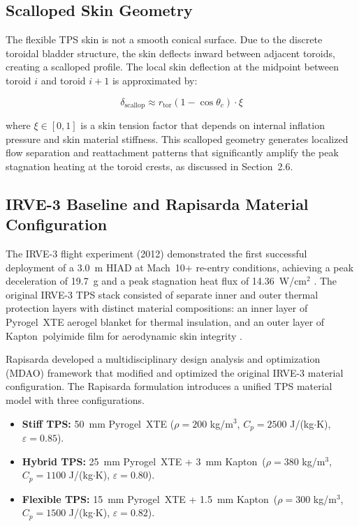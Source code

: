 \subsection{Scalloped Skin Geometry}

The flexible TPS skin is not a smooth conical surface. Due to the discrete toroidal bladder structure, the skin deflects inward between adjacent toroids, creating a scalloped profile. The local skin deflection at the midpoint between toroid $i$ and toroid $i+1$ is approximated by:

\begin{equation}
    \delta_{\text{scallop}} \approx r_{\text{tor}} \left(1 - \cos\theta_c\right) \cdot \xi
    \label{eq:scallop_deflection}
\end{equation}

\noindent where $\xi \in [0, 1]$ is a skin tension factor that depends on internal inflation pressure and skin material stiffness. This scalloped geometry generates localized flow separation and reattachment patterns that significantly amplify the peak stagnation heating at the toroid crests, as discussed in Section~2.6.



\subsection{IRVE-3 Baseline and Rapisarda Material Configuration}

The IRVE-3 flight experiment (2012) demonstrated the first successful deployment of a 3.0~m HIAD at Mach~10+ re-entry conditions, achieving a peak deceleration of 19.7~g and a peak stagnation heat flux of 14.36~W/cm$^2$ \cite{old2013irve3postflight}. The original IRVE-3 TPS stack consisted of separate inner and outer thermal protection layers with distinct material compositions: an inner layer of Pyrogel\texttrademark\ XTE aerogel blanket for thermal insulation, and an outer layer of Kapton\texttrademark\ polyimide film for aerodynamic skin integrity \cite{dillman2015irve3}.

Rapisarda \cite{rapisarda2023mdao} developed a multidisciplinary design analysis and optimization (MDAO) framework that modified and optimized the original IRVE-3 material configuration. The Rapisarda formulation introduces a unified TPS material model with three configurations.

\begin{itemize}
    \item \textbf{Stiff TPS:} 50~mm Pyrogel\texttrademark\ XTE ($\rho = 200$ kg/m$^3$, $C_p = 2500$ J/(kg$\cdot$K), $\varepsilon = 0.85$).

    \item \textbf{Hybrid TPS:} 25~mm Pyrogel\texttrademark\ XTE + 3~mm Kapton\texttrademark\ ($\rho = 380$ kg/m$^3$, $C_p = 1100$ J/(kg$\cdot$K), $\varepsilon = 0.80$).

    \item \textbf{Flexible TPS:} 15~mm Pyrogel\texttrademark\ XTE + 1.5~mm Kapton\texttrademark\ ($\rho = 300$ kg/m$^3$, $C_p = 1500$ J/(kg$\cdot$K), $\varepsilon = 0.82$).
\end{itemize}

